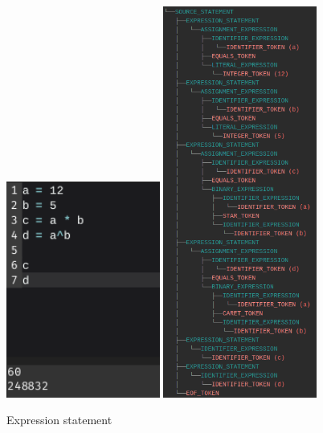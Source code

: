 \documentclass[
]{report}
\begin{document}
\begin{appendices}
	\begin{figure}
		\centering
		\includegraphics[width=0.45\textwidth]{expression-code}
		\includegraphics[width=0.45\textwidth]{expression-tree}
		\caption{Expression statement}
		\label{fig:expression-statement}
	\end{figure}
	\begin{figure}
		\centering

\end{figure}
\end{appendices}
\end{document}
